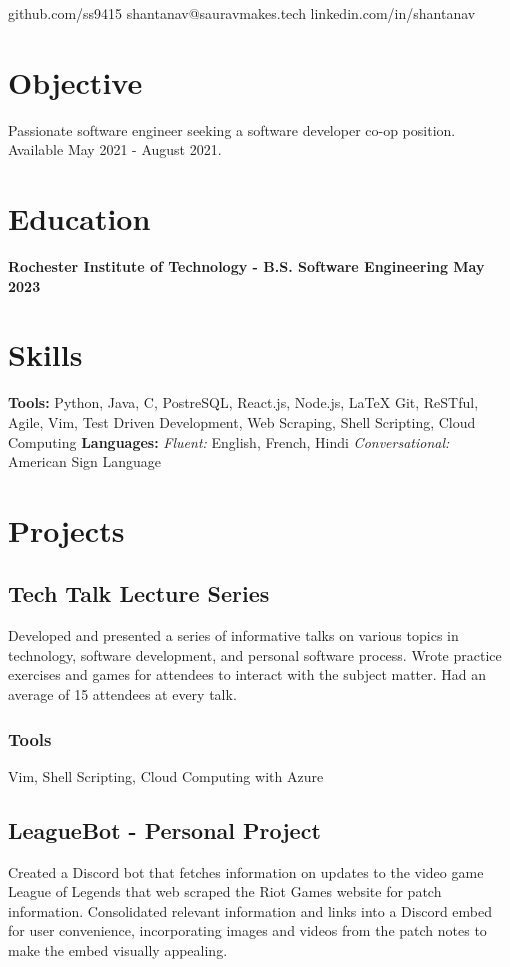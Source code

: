 \documentclass[11pt, letterpaper]{article}
\makeatletter
\renewcommand{\maketitle} {
    \thispagestyle{empty}
    \begin{center}    
        {\huge\bfseries \theauthor}

        \vspace{.5em}

        \quad \quad \quad \quad
        \faGithub \quad github.com/ss9415 \quad 
        \Letter \quad  shantanav@sauravmakes.tech \quad
        \faLinkedin \quad linkedin.com/in/shantanav \quad  

    \end{center}
}
\makeatother
\begin{document}
    \author{Shantanav Saurav}
    \maketitle

    \section{Objective}
        Passionate software engineer seeking a software developer co-op position. 
        Available May 2021 - August 2021.
    \section{Education}
        \textbf{Rochester Institute of Technology - B.S. Software Engineering \hfill May 2023}

    \section{Skills}
        \textbf{Tools:}
            Python, Java, C, PostreSQL, React.js, Node.js, LaTeX Git, ReSTful, Agile, Vim,
            Test Driven Development, Web Scraping, Shell Scripting, Cloud Computing \newline
        \textbf{Languages:}
            \emph{Fluent:} English, French, Hindi 
            \emph{Conversational:} American Sign Language

    \section{Projects}
        \subsection{Tech Talk Lecture Series}
            Developed and presented a series of informative talks on various topics in technology, software 
            development, and personal software process. Wrote practice exercises and games for attendees to 
            interact with the subject matter. Had an average of 15 attendees at every talk.
            \subsubsection{Tools}
                Vim, Shell Scripting, Cloud Computing with Azure

        \subsection{LeagueBot - Personal Project}
            Created a Discord bot that fetches information on updates to the video game League of Legends 
            that web scraped the Riot Games website for patch information. Consolidated relevant information 
            and links into a Discord embed for user convenience, incorporating images and videos from the 
            patch notes to make the embed visually appealing.
\end{document}
